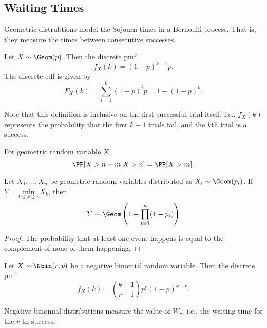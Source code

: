 \subsection{Waiting Times}

\begin{definition}

Geometric distrubtions model the \ac{Sojourn times} in a Bernoulli process. That is, they measure the times between consecutive successes. 
\end{definition}

\begin{definition}

Let $X\sim \Geom(p)$. Then the discrete pmf 
\[f_X(k) = (1-p)^{k-1}p.\]
The discrete cdf is given by
\[F_X(k) = \sum_{i=1}^k (1-p)^ip = 1-(1-p)^k.\]
\end{definition}

Note that this definition is inclusive on the first successful trial itself, i.e., $f_X(k)$ represents the probability that the first $k-1$ trials fail, and the $k$th trial is a success. 

\begin{theorem}

For geometric random variable $X$,
\[\PP[X > n+m | X > n] = \PP[X > m].\]
\end{theorem}

\begin{theorem}
\lemlabel

Let $X_1, \hdots, X_n$ be geometric random variables distributed as $X_i\sim \Geom(p_i)$. If $Y = \underset{1\leq k\leq n}{\text{min}} X_k$, then 
\[Y\sim \Geom\left(1 - \prod_{i=1}^n (1-p_i) \right)\]
\end{theorem}

\begin{proof}
The probability that at least one event happens is equal to the complement of none of them happening.
\end{proof}

\begin{definition}

Let $X\sim \Nbin(r,p)$ be a \ac{negative binomial} random variable. Then the discrete pmf 
\[f_X(k) = \binom{k-1}{r-1}p^{r}(1-p)^{k-r}.\]
\end{definition}

Negative binomial distributions measure the value of $W_r$, i.e., the waiting time for the $r$-th success. 

